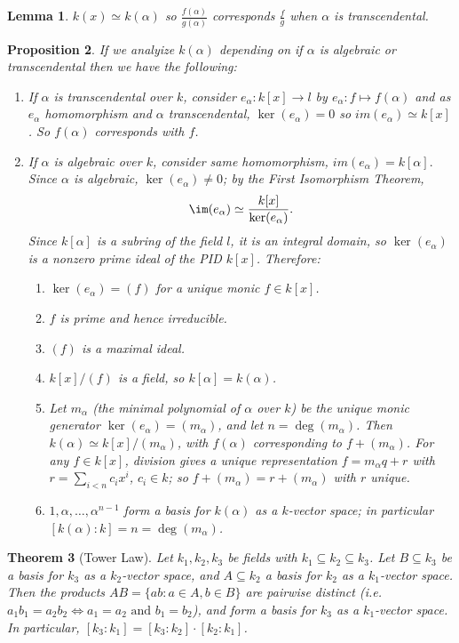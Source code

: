 \documentclass[a4paper,12pt]{article}
\newtheorem{thm}{Theorem}[section]
\newtheorem{lem}[thm]{Lemma}
\newtheorem{prop}[thm]{Proposition}
\begin{document}
\begin{lem}
    $k(x)\simeq k(\alpha)$ so $\frac{f(\alpha)}{g(\alpha)}$ corresponds $\frac{f}{g}$ when $\alpha$ is transcendental. 
\end{lem}
\begin{prop}
    If we analyize $k(\alpha)$ depending on if $\alpha$ is algebraic or transcendental then we have the following:
    \begin{enumerate}
        \item If $\alpha$ is transcendental over $k$, consider $e_\alpha:k[x]\to l$ by $e_\alpha:f\mapsto f(\alpha)$ and as $e_\alpha$ homomorphism and $\alpha$ transcendental, $\ker(e_\alpha)=0$ so $im(e_\alpha)\simeq k[x]$. So $f(\alpha)$ corresponds with $f$. 
        \item If $\alpha$ is algebraic over $k$, consider same homomorphism, $im(e_\alpha)=k[\alpha].$ \\
        Since $\alpha$ is algebraic, $\ker(e_\alpha)\neq 0$; by the First Isomorphism Theorem,
        \[
        \im(e_\alpha)\simeq \frac{k[x]}{\ker(e_\alpha)}.
        \]
        Since $k[\alpha]$ is a subring of the field $l$, it is an integral domain, so $\ker(e_\alpha)$ is a nonzero prime ideal of the PID $k[x]$. Therefore:
        \begin{enumerate}
            \item $\ker(e_\alpha)=(f)$ for a unique monic $f\in k[x]$.
            \item $f$ is prime and hence irreducible.
            \item $(f)$ is a maximal ideal.
            \item $k[x]/(f)$ is a field, so $k[\alpha]=k(\alpha)$.
            \item Let $m_\alpha$ (the \emph{minimal polynomial of $\alpha$ over $k$}) be the unique monic generator $\ker(e_\alpha)=(m_\alpha)$, and let $n=\deg(m_\alpha)$. Then $k(\alpha)\simeq k[x]/(m_\alpha)$, with $f(\alpha)$ corresponding to $f+(m_\alpha)$. For any $f\in k[x]$, division gives a unique representation $f=m_\alpha q+r$ with $r=\sum_{i<n} c_ix^i$, $c_i\in k$; so $f+(m_\alpha)=r+(m_\alpha)$ with $r$ unique.
            \item $1,\alpha,\dots,\alpha^{n-1}$ form a basis for $k(\alpha)$ as a $k$-vector space; in particular $[k(\alpha):k]=n=\deg(m_\alpha)$.
        \end{enumerate}
    \end{enumerate}
\end{prop}
\begin{thm}[Tower Law]
    Let $k_1,k_2,k_3$ be fields with $k_1\subseteq k_2\subseteq k_3$. Let $B\subseteq k_3$ be a basis for $k_3$ as a $k_2$-vector space, and $A\subseteq k_2$ a basis for $k_2$ as a $k_1$-vector space. Then the products $AB=\{ab: a\in A, b\in B\}$ are pairwise distinct (i.e.\ $a_1b_1=a_2b_2\iff a_1=a_2\text{ and }b_1=b_2$), and form a basis for $k_3$ as a $k_1$-vector space. In particular, $[k_3:k_1]=[k_3:k_2]\cdot [k_2:k_1]$.
\end{thm}
\end{document}
